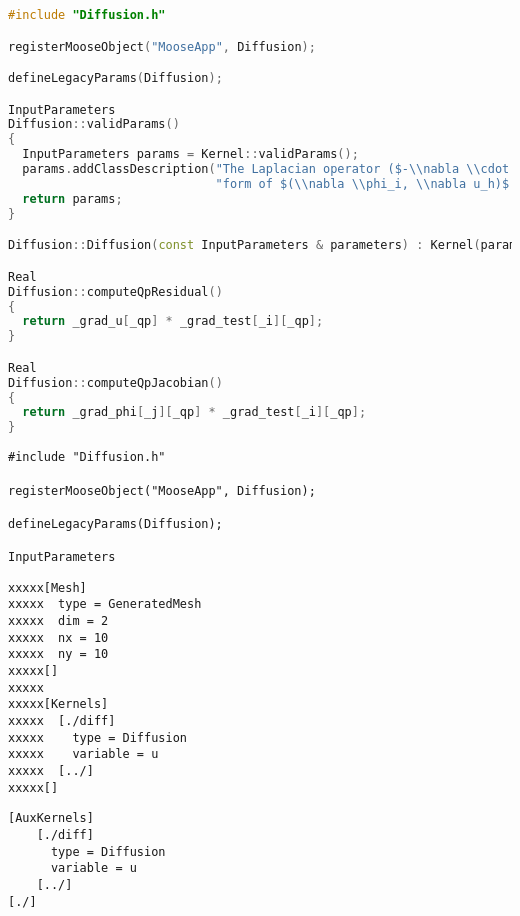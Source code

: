 \begin{lstlisting}[language=C++,]
#include "Diffusion.h"

registerMooseObject("MooseApp", Diffusion);

defineLegacyParams(Diffusion);

InputParameters
Diffusion::validParams()
{
  InputParameters params = Kernel::validParams();
  params.addClassDescription("The Laplacian operator ($-\\nabla \\cdot \\nabla u$), with the weak "
                             "form of $(\\nabla \\phi_i, \\nabla u_h)$.");
  return params;
}

Diffusion::Diffusion(const InputParameters & parameters) : Kernel(parameters) {}

Real
Diffusion::computeQpResidual()
{
  return _grad_u[_qp] * _grad_test[_i][_qp];
}

Real
Diffusion::computeQpJacobian()
{
  return _grad_phi[_j][_qp] * _grad_test[_i][_qp];
}
\end{lstlisting}

\begin{verbatim}
#include "Diffusion.h"

registerMooseObject("MooseApp", Diffusion);

defineLegacyParams(Diffusion);

InputParameters
\end{verbatim}

\begin{verbatim}
xxxxx[Mesh]
xxxxx  type = GeneratedMesh
xxxxx  dim = 2
xxxxx  nx = 10
xxxxx  ny = 10
xxxxx[]
xxxxx
xxxxx[Kernels]
xxxxx  [./diff]
xxxxx    type = Diffusion
xxxxx    variable = u
xxxxx  [../]
xxxxx[]
\end{verbatim}

\begin{verbatim}
[AuxKernels]
    [./diff]
      type = Diffusion
      variable = u
    [../]
[./]
\end{verbatim}
